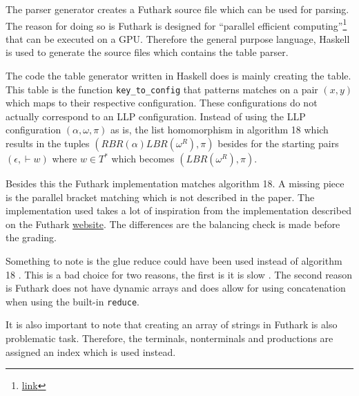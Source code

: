 The parser generator creates a Futhark source file which can be used for parsing. The reason for doing so is Futhark is designed for ``parallel efficient computing''\footnote{\href{https://futhark-lang.org/}{link}} that can be executed on a GPU. Therefore the general purpose language, Haskell is used to generate the source files which contains the table parser.

The code the table generator written in Haskell does is mainly creating the table. This table is the function \lstinline{key_to_config} that patterns matches on a pair $(x, y)$ which maps to their respective configuration. These configurations do not actually correspond to an LLP configuration. Instead of using the LLP configuration $(\alpha, \omega, \pi)$ as is, the list homomorphism in algorithm 18 \cite[18]{Vagner2007} which results in the tuples $(RBR(\alpha)LBR(\omega^R), \pi)$ besides for the starting pairs $(\epsilon, \vdash w)$ where $w \in T^*$ which becomes $(LBR(\omega^R), \pi)$.

Besides this the Futhark implementation matches algorithm 18. A missing piece is the parallel bracket matching which is not described in the paper. The implementation used takes a lot of inspiration from the implementation described on the Futhark \href{https://futhark-lang.org/examples/parens.html}{website}. The differences are the balancing check is made before the grading.

Something to note is the glue \cite[7]{Vagner2007} reduce could have been used instead of algorithm 18 \cite[18]{Vagner2007}. This is a bad choice for two reasons, the first is it is slow \cite[17]{Vagner2007}. The second reason is Futhark does not have dynamic arrays and does allow for using concatenation when using the built-in \lstinline{reduce}.

It is also important to note that creating an array of strings in Futhark is also problematic task. Therefore, the terminals, nonterminals and productions are assigned an index which is used instead. 